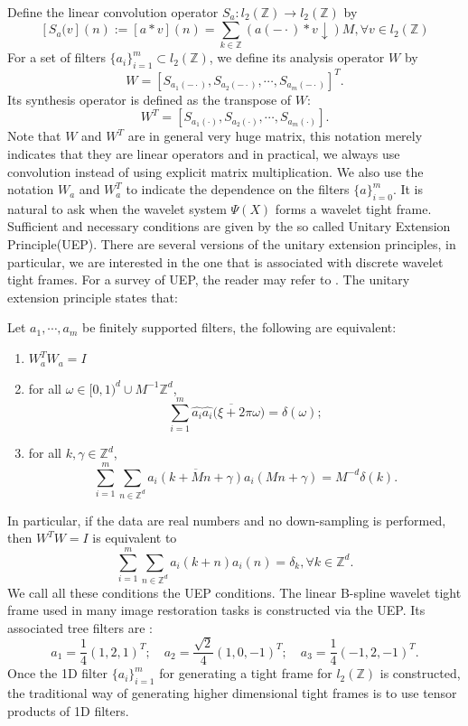 \documentclass[a4paper]{article}
\begin{document}
Define the linear convolution operator $S_a: l_2(\mathbb{Z}) \rightarrow l_2(\mathbb{Z})$ by 
\[
[S_a(v](n):=[a*v](n)=\sum_{k\in\mathbb{Z}} (a(-\cdot)*v \downarrow)M, \forall v\in l_2(\mathbb{Z})
\]
For a set of filters $\{a_i\}_{i=1}^m\subset l_2(\mathbb{Z})$, we define its analysis operator $W$ by 
\[
W=[S_{a_1(-\cdot)},S_{a_2(-\cdot)},\cdots,S_{a_m(-\cdot)}]^T.
\]
Its synthesis operator is defined as the transpose of $W$:
\[
W^T=[S_{a_1(\cdot)},S_{a_2(\cdot)},\cdots, S_{a_m(\cdot )}].
\]
Note that $W$ and $W^T$ are in general very huge matrix, this notation merely indicates that they are linear operators and in practical, we always use convolution instead of using explicit matrix multiplication. We also use the notation $W_a$ and $W^T_a$ to indicate the dependence on the filters $\{a\}_{i=0}^m$.
It is natural to ask when the wavelet system $\Psi(X)$ forms a wavelet tight frame. Sufficient and necessary conditions are given by the so called Unitary Extension Principle(UEP). There are several versions of the unitary extension principles, in particular, we are interested in the one that is associated with discrete wavelet tight frames. For a survey of UEP, the reader may refer to \cite{benedetto2001wavelet}. The unitary extension principle states that:
\begin{thm}\cite{han2011adaptive}
Let $a_1,\cdots,a_m$ be finitely supported filters, the following are equivalent:
\begin{enumerate}
\item $W_a^T W_a = I$
\item for all $\omega \in [0,1)^d\cup M^{-1}\mathbb{Z}^d$,
\[
	\sum_{i=1}^m \hat{a_i}\overline{\hat{a_i}(\xi + 2\pi\omega})=\delta(\omega);
\]
\item for  all $k,\gamma \in \mathbb{Z}^d$,
\[
	\sum_{i=1}^m \sum_{n\in\mathbb{Z}^d} \overline{a_i(k+Mn+\gamma)}a_i(Mn+\gamma)=M^{-d}\delta(k).
\]
\end{enumerate}
\end{thm}
In particular, if the data are real numbers and no down-sampling is performed, then $W^TW=I$ is equivalent to 
\begin{equation}
\label{eq:uep}
\sum_{i=1}^m \sum_{n\in \mathbb{Z}^d} a_i(k+n) a_i(n)=\delta_k, \forall k\in \mathbb{Z}^d.
\end{equation}
We call all these conditions the UEP conditions. The linear B-spline wavelet tight frame used in many image restoration tasks is constructed via the UEP. Its associated tree filters are :
\[
a_1=\frac{1}{4}(1,2,1)^T; \quad a_2=\frac{\sqrt{2}}{4}(1,0,-1)^T; \quad a_3=\frac{1}{4}(-1,2,-1)^T.
\]
Once the 1D filter $\{a_i\}_{i=1}^m$ for generating a tight frame for $l_2(\mathbb{Z})$ is constructed, the traditional way of generating higher dimensional tight frames is to use tensor products of 1D filters.
\end{document}
